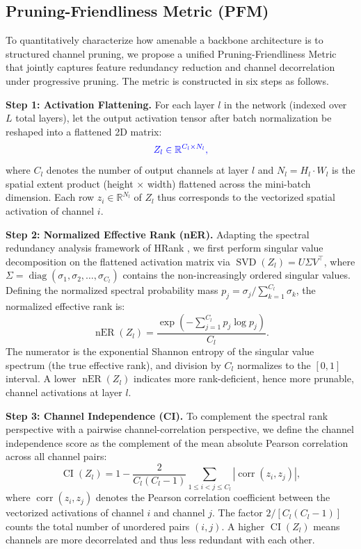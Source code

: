 \documentclass[conference]{IEEEtran}
\providecommand{\DIFadd}[1]{{\protect\color{blue}#1}}
\begin{document}
\subsection{\DIFadd{Pruning-Friendliness Metric (PFM)}}
\DIFadd{To quantitatively characterize how amenable a backbone architecture is to structured channel pruning, we propose a unified Pruning-Friendliness Metric that jointly captures feature redundancy reduction and channel decorrelation under progressive pruning.} \DIFadd{The metric is constructed in six steps as follows.}

\textbf{Step 1: Activation Flattening.} For each layer $l$ in the network (indexed over $L$ total layers), let the output activation tensor after batch normalization be reshaped into a flattened 2D matrix:
\begin{equation}
\DIFadd{Z_l \in \mathbb{R}^{C_l \times N_l},}
\end{equation}
\DIFadd{where $C_l$ denotes the number of output channels at layer $l$ and $N_l = H_l \cdot W_l$ is the spatial extent product (height $\times$ width) flattened across the mini-batch dimension.} \DIFadd{Each row $z_i \in \mathbb{R}^{N_l}$ of $Z_l$ thus corresponds to the vectorized spatial activation of channel $i$.}

\textbf{Step 2: Normalized Effective Rank (nER).} Adapting the spectral redundancy analysis framework of HRank \cite{lin2020hrank}, we first perform singular value decomposition on the flattened activation matrix via $\operatorname{SVD}(Z_l) = U \Sigma V^\top$, where $\Sigma = \operatorname{diag}(\sigma_1, \sigma_2, \ldots, \sigma_{C_l})$ contains the non-increasingly ordered singular values. Defining the normalized spectral probability mass $p_j = \sigma_j / \sum_{k=1}^{C_l} \sigma_k$, the normalized effective rank is:
\begin{equation}
\operatorname{nER}(Z_l) = \frac{\exp\left(-\sum_{j=1}^{C_l} p_j \log p_j\right)}{C_l}.
\end{equation}
\DIFadd{The numerator is the exponential Shannon entropy of the singular value spectrum (the true effective rank), and division by $C_l$ normalizes to the $[0, 1]$ interval.} \DIFadd{A lower $\operatorname{nER}(Z_l)$ indicates more rank-deficient, hence more prunable, channel activations at layer $l$.}

\textbf{Step 3: Channel Independence (CI).} To complement the spectral rank perspective with a pairwise channel-correlation perspective, we define the channel independence score as the complement of the mean absolute Pearson correlation across all channel pairs:
\begin{equation}
\operatorname{CI}(Z_l) = 1 - \frac{2}{C_l(C_l - 1)} \sum_{1 \leq i < j \leq C_l} \left| \operatorname{corr}(z_i, z_j) \right|,
\end{equation}
\DIFadd{where $\operatorname{corr}(z_i, z_j)$ denotes the Pearson correlation coefficient between the vectorized activations of channel $i$ and channel $j$.} \DIFadd{The factor $2/[C_l(C_l-1)]$ counts the total number of unordered pairs $(i,j)$.} \DIFadd{A higher $\operatorname{CI}(Z_l)$ means channels are more decorrelated and thus less redundant with each other.}
\end{document}
